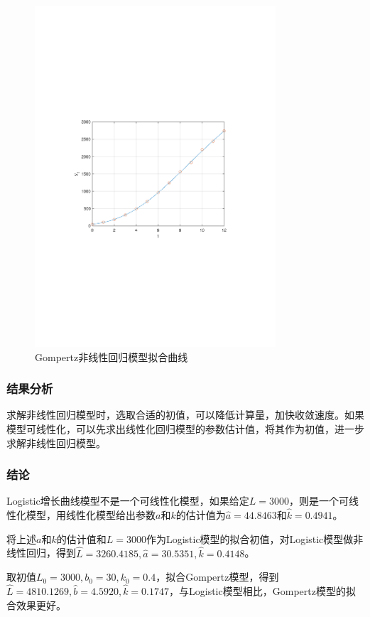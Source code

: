 \begin{figure}[H]
    \centering
    \includegraphics[width=0.8\textwidth,trim={3.09cm 9.295cm 3.09cm 9.295cm},clip]{fig/ex13_gompertz_nonlinear.pdf}
    \caption{Gompertz非线性回归模型拟合曲线}
    \label{fig:ex13_gompertz_nonlinear}
\end{figure}

\subsubsection{结果分析}

求解非线性回归模型时，选取合适的初值，可以降低计算量，加快收敛速度。如果模型可线性化，可以先求出线性化回归模型的参数估计值，将其作为初值，进一步求解非线性回归模型。

\subsubsection{结论}

Logistic增长曲线模型不是一个可线性化模型，如果给定$L=3000$，则是一个可线性化模型，用线性化模型给出参数$a$和$k$的估计值为$\hat{a} = 44.8463$和$\hat{k} = 0.4941$。

将上述$a$和$k$的估计值和$L=3000$作为Logistic模型的拟合初值，对Logistic模型做非线性回归，得到$\hat{L} = 3260.4185, \hat{a} = 30.5351, \hat{k} = 0.4148$。

取初值$L_0=3000, b_0=30, k_0=0.4$，拟合Gompertz模型，得到$\hat{L} = 4810.1269, \hat{b} = 4.5920, \hat{k} = 0.1747$，与Logistic模型相比，Gompertz模型的拟合效果更好。
